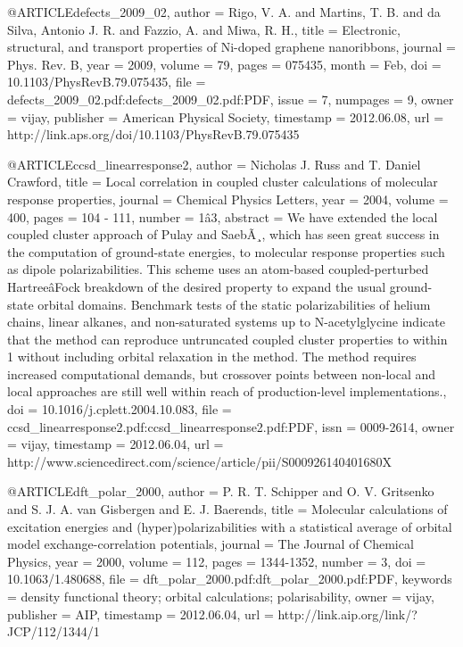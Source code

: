 @ARTICLE{defects_2009_02,
  author = {Rigo, V. A. and Martins, T. B. and da Silva, Antonio J. R. and Fazzio,
	A. and Miwa, R. H.},
  title = {Electronic, structural, and transport properties of Ni-doped graphene
	nanoribbons},
  journal = {Phys. Rev. B},
  year = {2009},
  volume = {79},
  pages = {075435},
  month = {Feb},
  doi = {10.1103/PhysRevB.79.075435},
  file = {defects_2009_02.pdf:defects_2009_02.pdf:PDF},
  issue = {7},
  numpages = {9},
  owner = {vijay},
  publisher = {American Physical Society},
  timestamp = {2012.06.08},
  url = {http://link.aps.org/doi/10.1103/PhysRevB.79.075435}
}

@ARTICLE{ccsd_linearresponse2,
  author = {Nicholas J. Russ and T. Daniel Crawford},
  title = {Local correlation in coupled cluster calculations of molecular response
	properties},
  journal = {Chemical Physics Letters},
  year = {2004},
  volume = {400},
  pages = {104 - 111},
  number = {1â3},
  abstract = {We have extended the local coupled cluster approach of Pulay and SaebÃ¸,
	which has seen great success in the computation of ground-state energies,
	to molecular response properties such as dipole polarizabilities.
	This scheme uses an atom-based coupled-perturbed HartreeâFock breakdown
	of the desired property to expand the usual ground-state orbital
	domains. Benchmark tests of the static polarizabilities of helium
	chains, linear alkanes, and non-saturated systems up to N-acetylglycine
	indicate that the method can reproduce untruncated coupled cluster
	properties to within 1%
	without including orbital relaxation in the method. The method requires
	increased computational demands, but crossover points between non-local
	and local approaches are still well within reach of production-level
	implementations.},
  doi = {10.1016/j.cplett.2004.10.083},
  file = {ccsd_linearresponse2.pdf:ccsd_linearresponse2.pdf:PDF},
  issn = {0009-2614},
  owner = {vijay},
  timestamp = {2012.06.04},
  url = {http://www.sciencedirect.com/science/article/pii/S000926140401680X}
}

@ARTICLE{dft_polar_2000,
  author = {P. R. T. Schipper and O. V. Gritsenko and S. J. A. van Gisbergen
	and E. J. Baerends},
  title = {Molecular calculations of excitation energies and (hyper)polarizabilities
	with a statistical average of orbital model exchange-correlation
	potentials},
  journal = {The Journal of Chemical Physics},
  year = {2000},
  volume = {112},
  pages = {1344-1352},
  number = {3},
  doi = {10.1063/1.480688},
  file = {dft_polar_2000.pdf:dft_polar_2000.pdf:PDF},
  keywords = {density functional theory; orbital calculations; polarisability},
  owner = {vijay},
  publisher = {AIP},
  timestamp = {2012.06.04},
  url = {http://link.aip.org/link/?JCP/112/1344/1}
}

